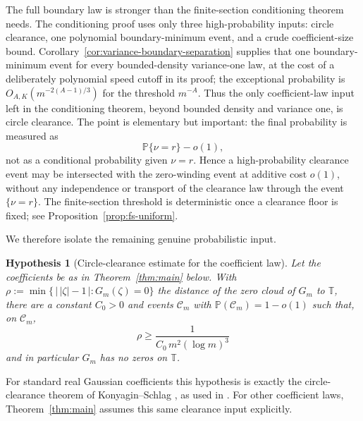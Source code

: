 \documentclass[11pt]{amsart}
\numberwithin{equation}{section}
\newtheorem{hypothesis}[theorem]{Hypothesis}
\theoremstyle{definition}
\theoremstyle{remark}
\newcommand{\T}{\mathbb T}
\newcommand{\Prob}{\mathbb P}
\newcommand{\abs}[1]{\left\lvert #1\right\rvert}
\begin{document}
The full boundary law is stronger than the finite-section conditioning theorem
needs.  The conditioning proof uses only three high-probability inputs: circle
clearance, one polynomial boundary-minimum event, and a crude coefficient-size
bound.  Corollary~\ref{cor:variance-boundary-separation} supplies that one
boundary-minimum event for every bounded-density variance-one law, at the cost
of a deliberately polynomial speed cutoff in its proof; the exceptional
probability is \(O_{A,K}(m^{-2(A-1)/3})\) for the threshold \(m^{-A}\).  Thus the only
coefficient-law input left in the conditioning theorem, beyond bounded density
and variance one, is circle clearance.
The point is elementary but important: the final probability is measured as
\[
  \Prob\{\nu=r\}-o(1),
\]
not as a conditional probability given \(\nu=r\).  Hence a high-probability clearance event may be intersected with the zero-winding event at additive cost \(o(1)\), without any independence or transport of the clearance law through the event \(\{\nu=r\}\).  The finite-section threshold is deterministic once a clearance floor is fixed; see Proposition~\ref{prop:fs-uniform}.

We therefore isolate the remaining genuine probabilistic input.

\begin{hypothesis}[Circle-clearance estimate for the coefficient law]\label{hyp:clearance}
Let the coefficients be as in Theorem~\ref{thm:main} below. With $\rho:=\min\{\,\abs{\,\abs\zeta-1\,}:G_m(\zeta)=0\}$ the distance of the zero cloud of $G_m$ to $\T$, there are a constant \(C_0>0\) and events \(\mathcal C_m\) with \(\Prob(\mathcal C_m)=1-o(1)\) such that, on \(\mathcal C_m\),
\[
  \rho\ge\frac{1}{C_0\,m^{2}(\log m)^{3}}
\]
and in particular \(G_m\) has no zeros on \(\T\).
\end{hypothesis}

For standard real Gaussian coefficients this hypothesis is exactly the circle-clearance theorem of Konyagin--Schlag \cite[Theorem~1.1]{KMS}, as used in \cite{Parity}.  For other coefficient laws, Theorem~\ref{thm:main} assumes this same clearance input explicitly.
\end{document}

